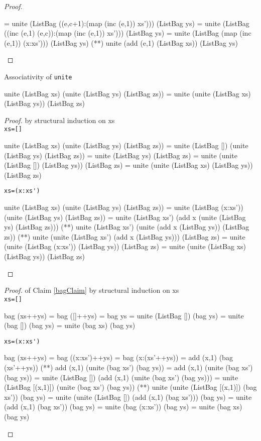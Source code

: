 \begin{proof}
\begin{code}
             = unite (ListBag ((e,c+1):(map (inc (e,1)) xs'))) (ListBag ys)
             = unite (ListBag ((inc (e,1) (e,c)):(map (inc (e,1)) xs'))) (ListBag ys)
             = unite (ListBag (map (inc (e,1)) (x:xs'))) (ListBag ys)
             (**) unite (add (e,1) (ListBag xs)) (ListBag ys)

\end{code}
\end{proof}
\begin{lemma}{Associativity of \verb|unite|}
\begin{code}
unite (ListBag xs) (unite (ListBag ys) (ListBag zs))
             = unite (unite (ListBag xs) (ListBag ys)) (ListBag zs)
\end{code}
\end{lemma}
\begin{proof}by structural induction on xs\\
\verb|xs=[]|
\begin{code}
unite (ListBag xs) (unite (ListBag ys) (ListBag zs))
             = unite (ListBag []) (unite (ListBag ys) (ListBag zs))
             = unite (ListBag ys) (ListBag zs)
             = unite (unite (ListBag []) (ListBag ys)) (ListBag zs)
             = unite (unite (ListBag xs) (ListBag ys)) (ListBag zs)
\end{code}
\verb|xs=(x:xs')|
\begin{code}
unite (ListBag xs) (unite (ListBag ys) (ListBag zs))
             = unite (ListBag (x:xs')) (unite (ListBag ys) (ListBag zs))
             = unite (ListBag xs') (add x (unite (ListBag ys) (ListBag zs)))
             (**) unite (ListBag xs') (unite (add x (ListBag ys)) (ListBag zs))
             (**) unite (unite (ListBag xs') (add x (ListBag ys))) (ListBag zs)
             = unite (unite (ListBag (x:xs')) (ListBag ys)) (ListBag zs)
             = unite (unite (ListBag xs) (ListBag ys)) (ListBag zs)
\end{code}
\end{proof}
\begin{proof}of Claim \ref{bagClaim} by structural induction on xs\\
\verb|xs=[]|
\begin{code}
bag (xs++ys) = bag ([]++ys)
             = bag ys
             = unite (ListBag []) (bag ys) 
             = unite (bag []) (bag ys) 
             = unite (bag xs) (bag ys) 
\end{code}
\verb|xs=(x:xs')|
\begin{code}
bag (xs++ys) = bag ((x:xs')++ys)
             = bag (x:(xs'++ys))
             = add (x,1) (bag (xs'++ys))
             (**) add (x,1) (unite (bag xs') (bag ys))
             = add (x,1) (unite (bag xs') (bag ys))
             = unite (ListBag []) (add (x,1) (unite (bag xs') (bag ys)))
             = unite (ListBag [(x,1)]) (unite (bag xs') (bag ys))
             (**) unite (unite (ListBag [(x,1)]) (bag xs')) (bag ys)
             = unite (unite (ListBag []) (add (x,1) (bag xs'))) (bag ys)
             = unite (add (x,1) (bag xs')) (bag ys)
             = unite (bag (x:xs')) (bag ys)
             = unite (bag xs) (bag ys)
\end{code}
\end{proof}
